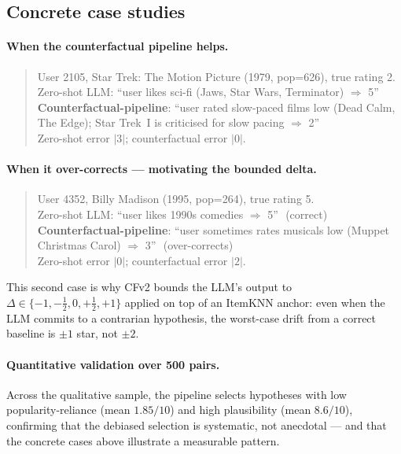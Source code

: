 \documentclass[11pt,a4paper]{article}
\begin{document}
\subsection{Concrete case studies}

\paragraph{When the counterfactual pipeline helps.}
\begin{quote}\small\ttfamily
User 2105, Star Trek: The Motion Picture (1979, pop=626), true rating 2.\\
Zero-shot LLM: ``user likes sci-fi (Jaws, Star Wars, Terminator) $\Rightarrow$ 5''\\
\textbf{Counterfactual-pipeline}: ``user rated slow-paced films low (Dead Calm, The Edge); Star Trek~I is criticised for slow pacing $\Rightarrow$ 2''\\
Zero-shot error $|3|$; counterfactual error $|0|$.
\end{quote}

\paragraph{When it over-corrects — motivating the bounded delta.}
\begin{quote}\small\ttfamily
User 4352, Billy Madison (1995, pop=264), true rating 5.\\
Zero-shot LLM: ``user likes 1990s comedies $\Rightarrow$ 5'' \,\,(correct)\\
\textbf{Counterfactual-pipeline}: ``user sometimes rates musicals low
(Muppet Christmas Carol) $\Rightarrow$ 3'' \,\,(over-corrects)\\
Zero-shot error $|0|$; counterfactual error $|2|$.
\end{quote}
This second case is why CFv2 bounds the LLM's output to
$\Delta\in\{-1,-\tfrac12,0,+\tfrac12,+1\}$ applied on top of an
ItemKNN anchor: even when the LLM commits to a contrarian hypothesis, the
worst-case drift from a correct baseline is $\pm 1$ star, not $\pm 2$.

\paragraph{Quantitative validation over 500 pairs.}
Across the qualitative sample, the pipeline selects hypotheses with low
popularity-reliance (mean $1.85/10$) and high plausibility (mean
$8.6/10$), confirming that the debiased selection is systematic, not
anecdotal --- and that the concrete cases above illustrate a measurable
pattern.
\end{document}
